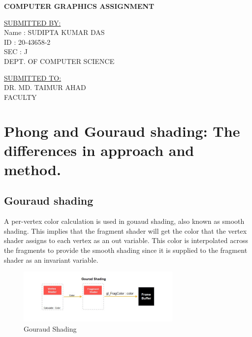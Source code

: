 \documentclass{article}
\begin{document}
\begin{titlepage}
    \begin{center}

        \vspace*{\fill}
        \Huge
        \textbf{COMPUTER GRAPHICS ASSIGNMENT} \\
        \vspace*{\fill}

        \vspace*{\fill}
        \raggedright
        \Large
        \underline{SUBMITTED BY:} \\
        \vspace*{0.2cm}
        Name : SUDIPTA KUMAR DAS \\
        ID   : 20-43658-2 \\
        SEC  : J \\
        DEPT. OF COMPUTER SCIENCE \\
        \vspace*{\fill}

        \vspace*{\fill}
        \raggedleft
        \Large
        \underline{SUBMITTED TO:} \\
        \vspace*{0.2cm}
        DR. MD. TAIMUR AHAD \\
        FACULTY
        \vspace*{\fill}


    \end{center}
\end{titlepage}

\tableofcontents
\listoffigures
\listoftables

\newpage

\section{Phong and Gouraud shading: The differences in  approach and method.}
\subsection{Gouraud shading}
A per-vertex color calculation is used in gouaud shading, also known as smooth
shading. This implies that the fragment shader will get the color that the vertex
shader assigns to each vertex as an out variable. This color is interpolated across
the fragments to provide the smooth shading since it is supplied to the fragment
shader as an invariant variable.
\begin{figure}[htbp]
    \begin{center}
        \includegraphics*[width=8cm]{gourad.jpg}
        \caption{Gouraud Shading}
    \end{center}
\end{figure}
\end{document}
